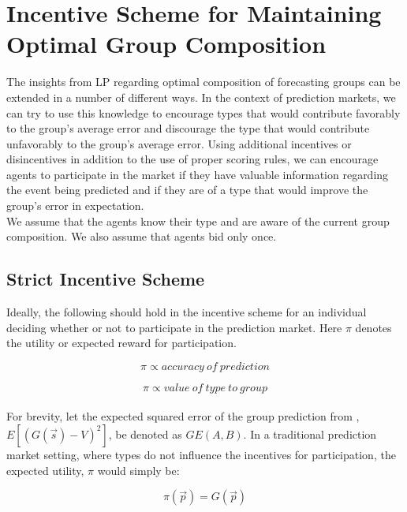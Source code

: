 \documentclass[twoside,twocolumn]{article}
\begin{document}
\section{Incentive Scheme for Maintaining Optimal Group Composition}

The insights from LP \cite{3} regarding optimal composition of forecasting groups can be extended in a number of different ways. In the context of prediction markets, we can try to use this knowledge to encourage types that would contribute favorably to the group's average error and discourage the type that would contribute unfavorably to the group's average error. Using additional incentives or disincentives in addition to the use of proper scoring rules, we can encourage agents to participate in the market if they have valuable information regarding the event being predicted and if they are of a type that would improve the group's error in expectation.\\

We assume that the agents know their type and are aware of the current group composition. We also assume that agents bid only once.

\subsection{Strict Incentive Scheme}

Ideally, the following should hold in the incentive scheme for an individual deciding whether or not to participate in the prediction market. Here $\pi$ denotes the utility or expected reward for participation.

\begin{equation}
\label{proportionalpredict}
\pi \propto accuracy \ of \ prediction
\end{equation}

\begin{equation}
\label{proportionaltype}
\pi \propto value \ of \ type \ to \ group
\end{equation}\\

For brevity, let the expected squared error of the group prediction from \cite{3}, $E[(G(\vec{s}) - V)^2]$, be denoted as $GE(A,B)$. In a traditional prediction market setting, where types do not influence the incentives for participation, the expected utility, $\pi$ would simply be:

\begin{equation}
\label{piorig}
\pi(\vec{p}) = G(\vec{p})
\end{equation}\\
\end{document}
